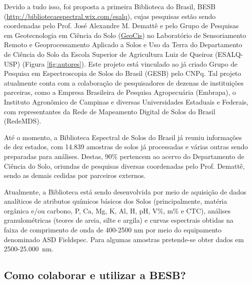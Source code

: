 Devido a tudo isso, foi proposta a primeira Biblioteca do Brasil, BESB (\url{http://bibliotecaespectral.wix.com/esalq}), cujas pesquisas estão sendo coordenadas pelo Prof. José Alexandre M. Demattê e pelo Grupo de Pesquisas em Geotecnologia em Ciência do Solo (\href{http://esalqgeocis.wix.com/geocis}{GeoCis}) no Laboratório de Sensoriamento Remoto e Geoprocessamento Aplicado a Solos e Uso da Terra do Departamento de Ciência do Solo da Escola Superior de Agricultura Luiz de Queiroz (ESALQ-USP) (Figura \ref{fig:autores}). Este projeto está vinculado ao já criado Grupo de Pesquisa em Espectroscopia de Solos do Brasil (GESB) pelo CNPq. Tal projeto atualmente conta com a colaboração de pesquisadores de dezenas de instituições parceiras, como a Empresa Brasileira de Pesquisa Agropecuária (Embrapa), o Instituto Agronômico de Campinas e diversas Universidades Estaduais e Federais, com representantes da Rede de Mapeamento Digital de Solos do Brasil (RedeMDS).

Até o momento, a Biblioteca Espectral de Solos do Brasil já reuniu informações de dez estados, com 14.839 amostras de solos já processadas e várias outras sendo preparadas para análises. Destas, 90\% pertencem ao acervo do Departamento de Ciência do Solo, oriundas de pesquisas diversas coordenadas pelo Prof. Demattê, sendo as demais cedidas por parceiros externos.

Atualmente, a Biblioteca está sendo desenvolvida por meio de aquisição de dados analíticos de atributos químicos básicos dos Solos (principalmente, matéria orgânica e/ou carbono, P, Ca, Mg, K, Al, H, pH, V\%, m\% e CTC), análises granulométricas (teores de areia, silte e argila) e curvas espectrais obtidas na faixa de comprimento de onda de 400-2500 nm por meio do equipamento denominado ASD Fieldspec. Para algumas amostras pretende-se obter dados em 2500-25.000~nm.

\subsection*{Como colaborar e utilizar a BESB?}

